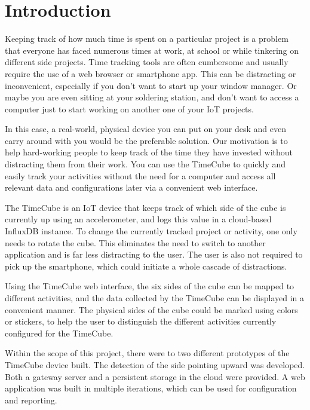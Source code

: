 \section{Introduction}

Keeping track of how much time is spent on a particular project is a problem that everyone has faced numerous times at work, at school or while tinkering on different side projects. Time tracking tools are often cumbersome and usually require the use of a web browser or smartphone app. This can be distracting or inconvenient, especially if you don't want to start up your window manager. Or maybe you are even sitting at your soldering station, and don't want to access a computer just to start working on another one of your IoT projects.

In this case, a real-world, physical device you can put on your desk and even carry around with you would be the preferable solution. Our motivation is to help hard-working people to keep track of the time they have invested without distracting them from their work. You can use the TimeCube to quickly and easily track your activities without the need for a computer and access all relevant data and configurations later via a convenient web interface.

The TimeCube is an IoT device that keeps track of which side of the cube is currently up using an accelerometer, and logs this value in a cloud-based InfluxDB instance. To change the currently tracked project or activity, one only needs to rotate the cube. This eliminates the need to switch to another application and is far less distracting to the user. The user is also not required to pick up the smartphone, which could initiate a whole cascade of distractions.

Using the TimeCube web interface, the six sides of the cube can be mapped to different activities, and the data collected by the TimeCube can be displayed in a convenient manner. The physical sides of the cube could be marked using colors or stickers, to help the user to distinguish the different activities currently configured for the TimeCube.

Within the scope of this project, there were to two different prototypes of the TimeCube device built. The detection of the side pointing upward was developed. Both a gateway server and a persistent storage in the cloud were provided. A web application was built in multiple iterations, which can be used for configuration and reporting.
